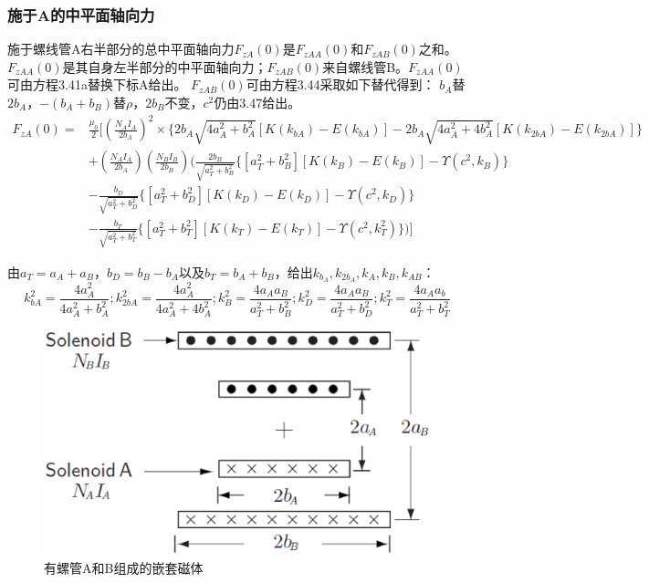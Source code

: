 \subsubsection{施于A的中平面轴向力}
施于螺线管A右半部分的总中平面轴向力$F_{zA}(0)$是$F_{zAA}(0)$和$F_{zAB}(0)$之和。$F_{zAA}(0)$是其自身左半部分的中平面轴向力；$F_{zAB}(0)$来自螺线管B。$F_{zAA}(0)$可由方程3.41a替换下标A给出。 $F_{zAB}(0)$可由方程3.44采取如下替代得到： $b_A$替$2b_A$，$−(b_A+b_B)$替$\rho$，$2b_B$不变，$c^2$仍由3.47给出。
\begin{equation}
\begin{split}
F_{zA}(0)=&\frac{\mu_0}{2}\bigg[(\frac{N_A I_A}{2b_A})^2\times \{2b_A\sqrt{4a_A^2+b_A^2}[K(k_{bA})-E(k_{bA})]-2b_A\sqrt{4a_A^2+4b_A^2}[K(k_{2bA})-E(k_{2bA})]\}\\
&+(\frac{N_AI_A}{2b_A})(\frac{N_BI_B}{2b_B})\big(\frac{2b_B}{\sqrt{a_T^2+b_B^2}}\{[a_T^2+b_B^2][K(k_B)-E(k_{B})]-\Upsilon(c^2,k_B)\}\\
&-\frac{b_D}{\sqrt{a_T^2+b_D^2}}\{{[a_T^2+b_D^2][K(k_D)-E(k_D)]-\Upsilon(c^2,k_D)}\}\\
&-\frac{b_T}{\sqrt{a_T^2+b_T^2}}\{[a_T^2+b_T^2][K(k_T)-E(k_T)]-\Upsilon(c^2,k_T^2)\}\big)\bigg]
\end{split}
\end{equation}

由$a_T=a_A+a_B$，$b_D=b_B-b_A$以及$b_T=b_A+b_B$，给出$k_{b_A}, k_{2b_A}, k_A,k_B, k_{AB}$：
$$ k_{bA}^2=\frac{4a_A^2}{4a_A^2+b_A^2}; k_{2bA}^2=\frac{4a_A^2}{4a_A^2+4b_A^2}; k_B^2=\frac{4a_Aa_B}{a_T^2+b_B^2};k_D^2=\frac{4a_Aa_B}{a_T^2+b_D^2}; k_T^2=\frac{4a_Aa_b}{a_T^2+b_T^2}$$

\begin{figure}[htbp]
  \centering
 \includegraphics[scale=0.4]{chpt3/figs/fig3.9.eps}
  \caption{有螺管A和B组成的嵌套磁体}
\end{figure}

